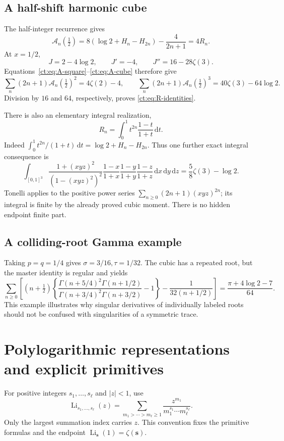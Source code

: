 \documentclass[11pt]{article}
\numberwithin{equation}{section}
\theoremstyle{definition}\newtheorem{definition}[theorem]{Definition}
\theoremstyle{remark}\newtheorem{remark}[theorem]{Remark}
\DeclareMathOperator{\Li}{Li}
\newcommand{\dd}{\,\mathrm d}
\begin{document}
\subsection{A half-shift harmonic cube}
The half-integer recurrence gives
\[
 \mathcal A_n(\tfrac12)
   =8(\log2+H_n-H_{2n})-\frac4{2n+1}=4R_n.
\]
At $x=1/2$,
\[
 J=2-4\log2,\qquad J'=-4,\qquad J''=16-28\zeta(3).
\]
Equations~\eqref{ct:eq:A-square}--\eqref{ct:eq:A-cube} therefore give
\[
 \sum_n(2n+1)\mathcal A_n(\tfrac12)^2=4\zeta(2)-4,
 \qquad
 \sum_n(2n+1)\mathcal A_n(\tfrac12)^3=40\zeta(3)-64\log2.
\]
Division by $16$ and $64$, respectively, proves
\eqref{ct:eq:R-identities}.

There is also an elementary integral realization,
\begin{equation}\label{ct:eq:R-integral}
 R_n=\int_0^1t^{2n}\frac{1-t}{1+t}\dd t.
\end{equation}
Indeed $\int_0^1t^{2n}/(1+t)\dd t=\log2+H_n-H_{2n}$.
Thus one further exact integral consequence is
\begin{equation}\label{ct:eq:triple-rational}
 \int_{[0,1]^3}\frac{1+(xyz)^2}{(1-(xyz)^2)^2}
        \frac{1-x}{1+x}\frac{1-y}{1+y}\frac{1-z}{1+z}
           \dd x\dd y\dd z
       =\frac58\zeta(3)-\log2.
\end{equation}
Tonelli applies to the positive power series
$\sum_{n\ge0}(2n+1)(xyz)^{2n}$; its integral is finite by the already
proved cubic moment. There is no hidden endpoint finite part.

\subsection{A colliding-root Gamma example}
Taking $p=q=1/4$ gives $\sigma=3/16,\tau=1/32$. The cubic has a repeated
root, but the master identity is regular and yields
\begin{equation}\label{ct:eq:quartergamma}
 \sum_{n\ge0}\left[
 (n+\tfrac12)\left\{
 \frac{\Gamma(n+5/4)^2\Gamma(n+1/2)}
      {\Gamma(n+3/4)^2\Gamma(n+3/2)}-1\right\}
 -\frac1{32(n+1/2)}\right]
       =\frac{\pi+4\log2-7}{64}.
\end{equation}
This example illustrates why singular derivatives of individually labeled
roots should not be confused with singularities of a symmetric trace.

\section{Polylogarithmic representations and explicit primitives}
\label{ct:sec:polylogs}
For positive integers $s_1,\ldots,s_\ell$ and $|z|<1$, use
\begin{equation}\label{ct:eq:multiple-li}
 \Li_{s_1,\ldots,s_\ell}(z)
  =\sum_{m_1>\cdots>m_\ell\ge1}
       \frac{z^{m_1}}{m_1^{s_1}\cdots m_\ell^{s_\ell}}.
\end{equation}
Only the largest summation index carries $z$. This convention fixes the
primitive formulas and the endpoint $\Li_{\boldsymbol s}(1)=\zeta(\boldsymbol s)$.
\end{document}
